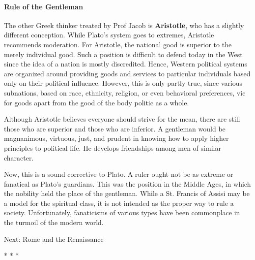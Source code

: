 \paragraph{Rule of the Gentleman}
The other Greek thinker treated by Prof Jacob is \textbf{Aristotle}, who has a slightly different conception. While Plato's system goes to extremes, Aristotle recommends moderation. For Aristotle, the national good is superior to the merely individual good. Such a position is difficult to defend today in the West since the idea of a nation is mostly discredited. Hence, Western political systems are organized around providing goods and services to particular individuals based only on their political influence. However, this is only partly true, since various subnations, based on race, ethnicity, religion, or even behavioral preferences, vie for goods apart from the good of the body politic as a whole.

Although Aristotle believes everyone should strive for the mean, there are still those who are superior and those who are inferior. A gentleman would be magnanimous, virtuous, just, and prudent in knowing how to apply higher principles to political life. He develops friendships among men of similar character.

Now, this is a sound corrective to Plato. A ruler ought not be as extreme or fanatical as Plato's guardians. This was the position in the Middle Ages, in which the nobility held the place of the gentleman. While a St. Francis of Assisi may be a model for the spiritual class, it is not intended as the proper way to rule a society. Unfortunately, fanaticisms of various types have been commonplace in the turmoil of the modern world.


\hfill

Next: Rome and the Renaissance




\begin{center}* * *\end{center}

